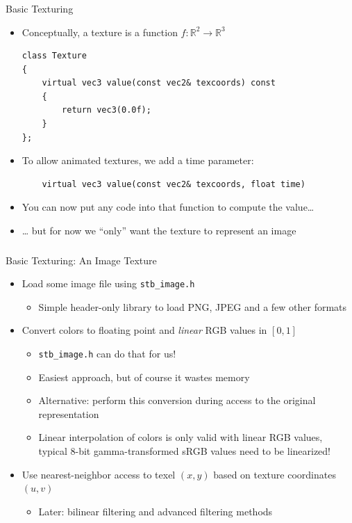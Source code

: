 \documentclass[utf8,stillsansserifmath,fleqn,t]{beamer}
\newcommand{\code}[1]{\texttt{#1}}
\begin{document}
\begin{frame}[fragile,label=basic-tex-1]
\frametitle{\insertsection}
Basic Texturing
\begin{itemize}
\item Conceptually, a texture is a function $f: \mathbb{R}^{2} \to \mathbb{R}^3$
\begin{lstlisting}
class Texture
{
    virtual vec3 value(const vec2& texcoords) const
    {
        return vec3(0.0f);
    }
};
\end{lstlisting}
\item To allow animated textures, we add a time parameter:
\begin{lstlisting}
    virtual vec3 value(const vec2& texcoords, float time)
\end{lstlisting}
\item You can now put any code into that function to compute the value\ldots{}
\item \ldots{} but for now we ``only'' want the texture to represent an image
\end{itemize}
\end{frame}

\begin{frame}
\frametitle{\insertsection}
Basic Texturing: An Image Texture
\begin{itemize}
\item Load some image file using \code{stb\_image.h}
    \begin{itemize}
    \item Simple header-only library to load PNG, JPEG and a few other formats
    \end{itemize}
\item Convert colors to floating point and \emph{linear} RGB values in $[0,1]$
    \begin{itemize}
    \item \code{stb\_image.h} can do that for us!
    \item Easiest approach, but of course it wastes memory
    \item Alternative: perform this conversion during access to the original
    representation
    \item Linear interpolation of colors is only valid with linear RGB values,\\
    typical 8-bit gamma-transformed sRGB values need to be linearized!
    \end{itemize}
\item Use nearest-neighbor access to texel $(x,y)$ based on texture coordinates
$(u,v)$
    \begin{itemize}
    \item Later: bilinear filtering and advanced filtering methods
    \end{itemize}
\end{itemize}
\end{frame}
\end{document}
